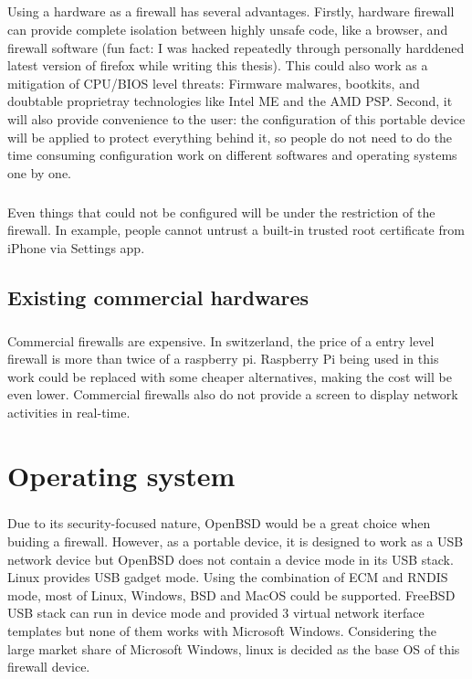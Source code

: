 \documentclass[mscthesis]{usiinfthesis}
\begin{document}
\paragraph{}
Using a hardware as a firewall has several advantages. Firstly, hardware
firewall can provide complete isolation between highly unsafe code,
like a browser, and firewall software (fun fact: I was hacked repeatedly
through personally harddened latest version of firefox while writing this
thesis). This could also work as a mitigation of CPU/BIOS level threats:
Firmware malwares, bootkits, and doubtable proprietray technologies like
Intel ME and the AMD PSP. Second, it will also provide convenience to the
user: the configuration of this portable device will be applied to protect
everything behind it, so people do not need to do the time consuming
configuration work on different softwares and operating systems one by one.
\paragraph{}
Even things that could not be configured will be under the restriction of the firewall. In example, people cannot untrust a built-in trusted root certificate from iPhone via Settings app.

\section{Existing commercial hardwares}
\paragraph{}
Commercial firewalls are expensive. In switzerland, the price of a entry
level firewall is more than twice of a raspberry pi. Raspberry Pi being
used in this work could be replaced with some cheaper alternatives, making
the cost will be even lower. Commercial firewalls also do not provide a
screen to display network activities in real-time.

\chapter{Operating system}

\paragraph{}
Due to its security-focused nature, OpenBSD would be a great choice when buiding a firewall. However, as a portable device, it is designed to work as a USB network device but OpenBSD does not contain a device mode in its USB stack. Linux provides USB gadget mode. Using the combination of ECM and RNDIS mode, most of Linux, Windows, BSD and MacOS could be supported. FreeBSD USB stack can run in device mode and provided 3 virtual network iterface templates but none of them works with Microsoft Windows\citep{freebsdhb:usb}. Considering the large market share of Microsoft Windows, linux is decided as the base OS of this firewall device.
\end{document}
